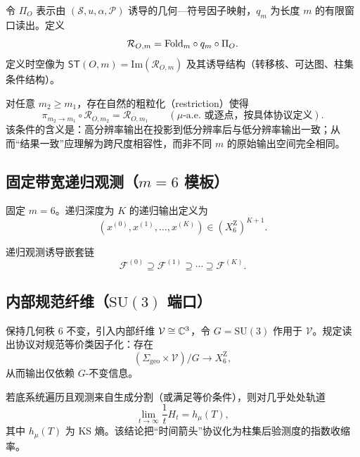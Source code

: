 \begin{definition}[读出算子与时空像]\label{def:readout-and-image-spec}
令 $\Pi_O$ 表示由 $(\mathcal{S},u,\alpha,\mathcal{P})$ 诱导的几何—符号因子映射，$q_m$ 为长度 $m$ 的有限窗口读出。定义
$$
\mathcal{R}_{O,m}=\mathrm{Fold}_m\circ q_m\circ \Pi_O.
$$
定义时空像为 $\mathsf{ST}(O,m)=\mathrm{Im}(\mathcal{R}_{O,m})$ 及其诱导结构（转移核、可达图、柱集条件结构）。
\end{definition}

\begin{assumption}\label{assump:readout-factorization}
对任意 $m_2\ge m_1$，存在自然的粗粒化（restriction）使得
\[
\pi_{m_2\to m_1}\circ \mathcal{R}_{O,m_2}=\mathcal{R}_{O,m_1}\qquad (\mu\text{-a.e. 或逐点，按具体协议定义}).
\]
该条件的含义是：高分辨率输出在投影到低分辨率后与低分辨率输出一致；从而“结果一致”应理解为跨尺度相容性，而非不同 $m$ 的原始输出空间完全相同。
\end{assumption}

\subsection{固定带宽递归观测（\texorpdfstring{$m=6$}{m=6} 模板）}

\begin{definition}[递归输出序列]\label{def:recursive-output-seq-spec}
固定 $m=6$。递归深度为 $K$ 的递归输出定义为
$$
(x^{(0)},x^{(1)},\dots,x^{(K)})\in (X_6^{\mathrm Z})^{K+1}.
$$
\end{definition}

\begin{definition}[嵌套纤维链]\label{def:nested-fiber-chain-spec}
递归观测诱导嵌套链
$$
\mathcal{F}^{(0)}\supseteq \mathcal{F}^{(1)}\supseteq \cdots \supseteq \mathcal{F}^{(K)}.
$$
\end{definition}

\subsection{内部规范纤维（\texorpdfstring{$\mathrm{SU}(3)$}{SU(3)} 端口）}

\begin{definition}[规范纤维扩展]\label{def:su3-fiber-port}
保持几何秩 $6$ 不变，引入内部纤维 $\mathcal{V}\cong\mathbb{C}^3$，令 $G=\mathrm{SU}(3)$ 作用于 $\mathcal{V}$。规定读出协议对规范等价类因子化：存在
$$
(\Sigma_{\mathrm{geo}}\times\mathcal{V})/G\to X_6^{\mathrm Z},
$$
从而输出仅依赖 $G$-不变信息。
\end{definition}

\begin{theorem}\label{thm:smb-template}
若底系统遍历且观测来自生成分割（或满足等价条件），则对几乎处处轨道
\[
\lim_{t\to\infty}\frac{1}{t}H_t=h_\mu(T),
\]
其中 $h_\mu(T)$ 为 KS 熵。该结论把“时间箭头”协议化为柱集后验测度的指数收缩率。
\end{theorem}

